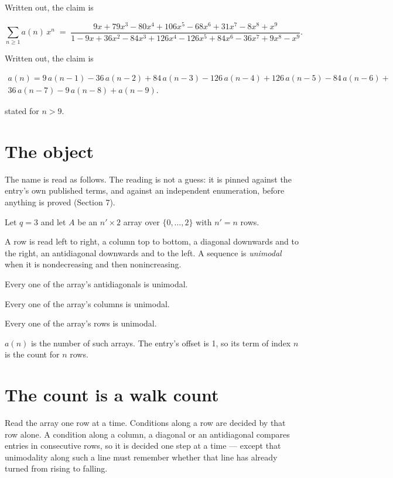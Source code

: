 \documentclass[11pt]{article}
\theoremstyle{definition}
\begin{document}
Written out, the claim is

\[\sum_{n \ge 1} a(n)\,x^n \;=\; \frac{9x + 79x^{3} - 80x^{4} + 106x^{5} - 68x^{6} + 31x^{7} - 8x^{8} + x^{9}}{1 - 9x + 36x^{2} - 84x^{3} + 126x^{4} - 126x^{5} + 84x^{6} - 36x^{7} + 9x^{8} - x^{9}}.\]

Written out, the claim is

\begin{multline*} a(n) = 9\,a(n-1) - 36\,a(n-2) + 84\,a(n-3) - 126\,a(n-4) + 126\,a(n-5) - 84\,a(n-6) + \\ 36\,a(n-7) - 9\,a(n-8) + a(n-9). \end{multline*}

stated for $n > 9$.

\section{The object}

The name is read as follows. The reading is not a guess: it is pinned against the entry's own published terms, and against an independent enumeration, before anything is proved (Section 7).

Let $q = 3$ and let $A$ be an $n' \times 2$ array over $\{0,\dots,2\}$ with $n' = n$ rows.

A row is read left to right, a column top to bottom, a diagonal downwards and to the right, an antidiagonal downwards and to the left. A sequence is {\itshape unimodal} when it is nondecreasing and then nonincreasing.

Every one of the array's antidiagonals is unimodal.

Every one of the array's columns is unimodal.

Every one of the array's rows is unimodal.

$a(n)$ is the number of such arrays. The entry's offset is 1, so its term of index $n$ is the count for $n$ rows.

\section{The count is a walk count}

Read the array one row at a time. Conditions along a row are decided by that row alone. A condition along a column, a diagonal or an antidiagonal compares entries in consecutive rows, so it is decided one step at a time --- except that unimodality along such a line must remember whether that line has already turned from rising to falling.
\end{document}

